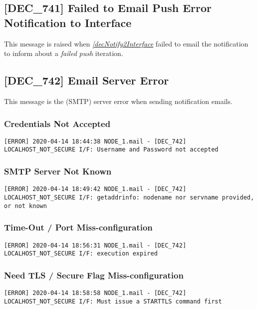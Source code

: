 \documentclass[dec_sum_main.tex]{subfiles}
\begin{document}
\label{DEC741}
\subsection{[DEC\_741] Failed to Email Push Error Notification to Interface}
This message is raised when \hyperref[decNotify2Interface]{\textit{[decNotify2Interface}} failed to email the notification to inform about a \textit{failed} \textit{push} iteration.

\label{DEC742}
\subsection{[DEC\_742] Email Server Error}
This message is the (SMTP) server error when sending notification emails.

\subsubsection{Credentials Not Accepted}

\begin{verbatim}
[ERROR] 2020-04-14 18:44:38 NODE_1.mail - [DEC_742] LOCALHOST_NOT_SECURE I/F: Username and Password not accepted
\end{verbatim}

\subsubsection{SMTP Server Not Known}

\begin{verbatim}
[ERROR] 2020-04-14 18:49:42 NODE_1.mail - [DEC_742] LOCALHOST_NOT_SECURE I/F: getaddrinfo: nodename nor servname provided, or not known
\end{verbatim}

\subsubsection{Time-Out / Port Miss-configuration}
\begin{verbatim}
[ERROR] 2020-04-14 18:56:31 NODE_1.mail - [DEC_742] LOCALHOST_NOT_SECURE I/F: execution expired
\end{verbatim}

\subsubsection{Need TLS / Secure Flag Miss-configuration}
\begin{verbatim}
[ERROR] 2020-04-14 18:58:58 NODE_1.mail - [DEC_742] LOCALHOST_NOT_SECURE I/F: Must issue a STARTTLS command first
\end{verbatim}
\end{document}

